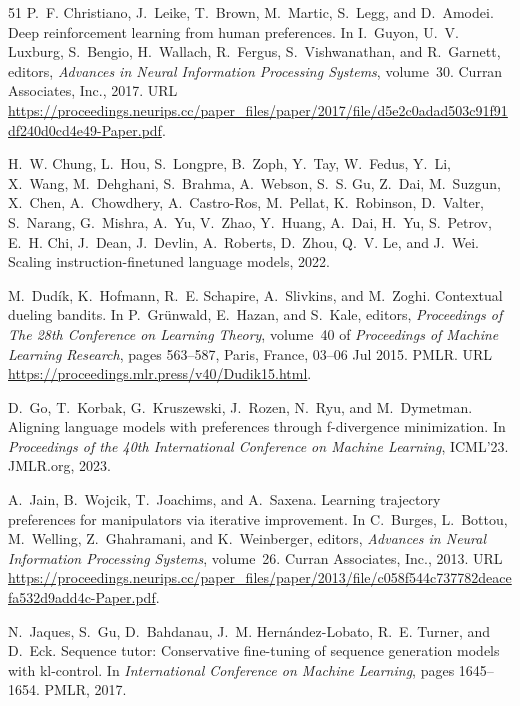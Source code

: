 \begin{thebibliography}{51}
P.~F. Christiano, J.~Leike, T.~Brown, M.~Martic, S.~Legg, and D.~Amodei.
\newblock Deep reinforcement learning from human preferences.
\newblock In I.~Guyon, U.~V. Luxburg, S.~Bengio, H.~Wallach, R.~Fergus,
  S.~Vishwanathan, and R.~Garnett, editors, \emph{Advances in Neural
  Information Processing Systems}, volume~30. Curran Associates, Inc., 2017.
\newblock URL
  \url{https://proceedings.neurips.cc/paper_files/paper/2017/file/d5e2c0adad503c91f91df240d0cd4e49-Paper.pdf}.

H.~W. Chung, L.~Hou, S.~Longpre, B.~Zoph, Y.~Tay, W.~Fedus, Y.~Li, X.~Wang,
  M.~Dehghani, S.~Brahma, A.~Webson, S.~S. Gu, Z.~Dai, M.~Suzgun, X.~Chen,
  A.~Chowdhery, A.~Castro-Ros, M.~Pellat, K.~Robinson, D.~Valter, S.~Narang,
  G.~Mishra, A.~Yu, V.~Zhao, Y.~Huang, A.~Dai, H.~Yu, S.~Petrov, E.~H. Chi,
  J.~Dean, J.~Devlin, A.~Roberts, D.~Zhou, Q.~V. Le, and J.~Wei.
\newblock Scaling instruction-finetuned language models, 2022.

M.~Dudík, K.~Hofmann, R.~E. Schapire, A.~Slivkins, and M.~Zoghi.
\newblock Contextual dueling bandits.
\newblock In P.~Grünwald, E.~Hazan, and S.~Kale, editors, \emph{Proceedings of
  The 28th Conference on Learning Theory}, volume~40 of \emph{Proceedings of
  Machine Learning Research}, pages 563--587, Paris, France, 03--06 Jul 2015.
  PMLR.
\newblock URL \url{https://proceedings.mlr.press/v40/Dudik15.html}.

D.~Go, T.~Korbak, G.~Kruszewski, J.~Rozen, N.~Ryu, and M.~Dymetman.
\newblock Aligning language models with preferences through f-divergence
  minimization.
\newblock In \emph{Proceedings of the 40th International Conference on Machine
  Learning}, ICML'23. JMLR.org, 2023.

A.~Jain, B.~Wojcik, T.~Joachims, and A.~Saxena.
\newblock Learning trajectory preferences for manipulators via iterative
  improvement.
\newblock In C.~Burges, L.~Bottou, M.~Welling, Z.~Ghahramani, and
  K.~Weinberger, editors, \emph{Advances in Neural Information Processing
  Systems}, volume~26. Curran Associates, Inc., 2013.
\newblock URL
  \url{https://proceedings.neurips.cc/paper_files/paper/2013/file/c058f544c737782deacefa532d9add4c-Paper.pdf}.

N.~Jaques, S.~Gu, D.~Bahdanau, J.~M. Hern{\'a}ndez-Lobato, R.~E. Turner, and
  D.~Eck.
\newblock Sequence tutor: Conservative fine-tuning of sequence generation
  models with kl-control.
\newblock In \emph{International Conference on Machine Learning}, pages
  1645--1654. PMLR, 2017.


\end{thebibliography}
